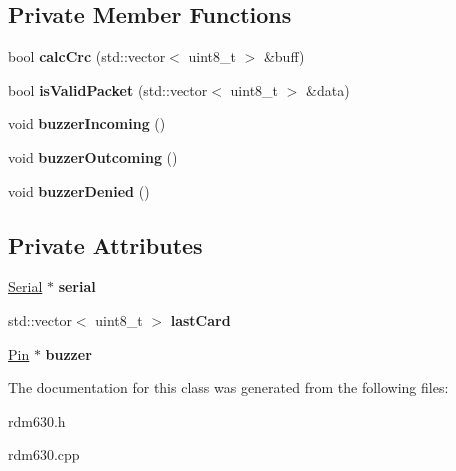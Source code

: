 \subsection*{Private Member Functions}
\begin{DoxyCompactItemize}
\item 
\mbox{\label{classRdm6300_a5a57029ca033dfb57dacb8af1279a63c}} 
bool {\bfseries calc\+Crc} (std\+::vector$<$ uint8\+\_\+t $>$ \&buff)
\item 
\mbox{\label{classRdm6300_a11bf89a8c306cdf0c329eb535d20c154}} 
bool {\bfseries is\+Valid\+Packet} (std\+::vector$<$ uint8\+\_\+t $>$ \&data)
\item 
\mbox{\label{classRdm6300_a38956667d6cd8aa2746bcdbe8de77e0c}} 
void {\bfseries buzzer\+Incoming} ()
\item 
\mbox{\label{classRdm6300_a81a9625c32a797937fecfee9268ac79d}} 
void {\bfseries buzzer\+Outcoming} ()
\item 
\mbox{\label{classRdm6300_a067a47af67954c2e845743ea5de3ebb0}} 
void {\bfseries buzzer\+Denied} ()
\end{DoxyCompactItemize}
\subsection*{Private Attributes}
\begin{DoxyCompactItemize}
\item 
\mbox{\label{classRdm6300_aab29f639a26cfce2ef7865f829efc1d4}} 
\hyperlink{classSerial}{Serial} $\ast$ {\bfseries serial}
\item 
\mbox{\label{classRdm6300_ab67e1bc66505b024850419b28cb44371}} 
std\+::vector$<$ uint8\+\_\+t $>$ {\bfseries last\+Card}
\item 
\mbox{\label{classRdm6300_adbb47250f01692e5394006137e50a1fa}} 
\hyperlink{classPin}{Pin} $\ast$ {\bfseries buzzer}
\end{DoxyCompactItemize}


The documentation for this class was generated from the following files\+:\begin{DoxyCompactItemize}
\item 
rdm630.\+h\item 
rdm630.\+cpp\end{DoxyCompactItemize}
